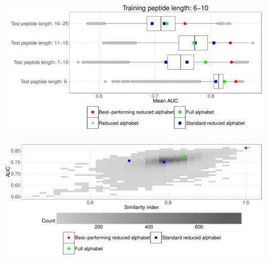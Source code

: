 \documentclass{beamer}\usepackage[]{graphicx}\usepackage[]{color}
\makeatletter
\def\maxwidth{ %
  \ifdim\Gin@nat@width>\linewidth
    \linewidth
  \else
    \Gin@nat@width
  \fi
}
\newenvironment{knitrout}{}{} %
\makeatother
\begin{document}
    \begin{frame}{}
\begin{knitrout}
\color{fgcolor}

{\centering \includegraphics[width=\maxwidth]{figure/unnamed-chunk-2-1} 

}



\end{knitrout}
  \end{frame}
  
    \begin{frame}{}
\begin{knitrout}
\color{fgcolor}

{\centering \includegraphics[width=\maxwidth]{figure/unnamed-chunk-3-1} 

}



\end{knitrout}
  \end{frame}  
\end{document}
